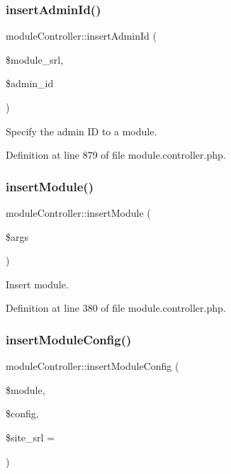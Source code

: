 \subsubsection{\texorpdfstring{insert\+Admin\+Id()}{insertAdminId()}}
{\footnotesize\ttfamily module\+Controller\+::insert\+Admin\+Id (\begin{DoxyParamCaption}\item[{}]{\$module\+\_\+srl,  }\item[{}]{\$admin\+\_\+id }\end{DoxyParamCaption})}



Specify the admin ID to a module. 



Definition at line 879 of file module.\+controller.\+php.

\mbox{\label{classmoduleController_a8876924470cbfa94679d73dc6fc61332}} 
\subsubsection{\texorpdfstring{insert\+Module()}{insertModule()}}
{\footnotesize\ttfamily module\+Controller\+::insert\+Module (\begin{DoxyParamCaption}\item[{}]{\$args }\end{DoxyParamCaption})}



Insert module. 



Definition at line 380 of file module.\+controller.\+php.

\mbox{\label{classmoduleController_a678c87caaf6b2d12e63237d87b11b7a9}} 
\subsubsection{\texorpdfstring{insert\+Module\+Config()}{insertModuleConfig()}}
{\footnotesize\ttfamily module\+Controller\+::insert\+Module\+Config (\begin{DoxyParamCaption}\item[{}]{\$module,  }\item[{}]{\$config,  }\item[{}]{\$site\+\_\+srl = {} }\end{DoxyParamCaption})}



